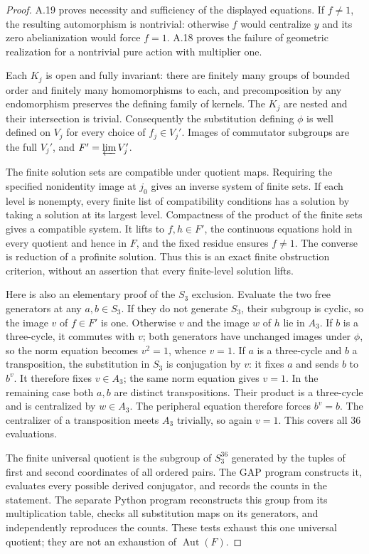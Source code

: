 \begin{proof}
A.19 proves necessity and sufficiency of the displayed
equations. If $f\ne1$, the resulting automorphism is
nontrivial: otherwise $f$ would centralize $y$ and its
zero abelianization would force $f=1$. A.18 proves the
failure of geometric realization for a nontrivial pure
action with multiplier one.

Each $K_j$ is open and fully invariant: there are finitely
many groups of bounded order and finitely many homomorphisms
to each, and precomposition by any endomorphism preserves
the defining family of kernels. The $K_j$ are nested and
their intersection is trivial. Consequently the
substitution defining $\phi$ is well defined on $V_j$
for every choice of $f_j\in V_j'$. Images of commutator
subgroups are the full $V_j'$, and
$F'=\varprojlim V_j'$.

The finite solution sets are compatible under quotient
maps. Requiring the specified nonidentity image at
$j_0$ gives an inverse system of finite sets. If each
level is nonempty, every finite list of compatibility
conditions has a solution by taking a solution at its
largest level. Compactness of the product of the finite
sets gives a compatible system. It lifts to $f,h\in F'$,
the continuous equations hold in every quotient and
hence in $F$, and the fixed residue ensures $f\ne1$.
The converse is reduction of a profinite solution. Thus
this is an exact finite obstruction criterion, without
an assertion that every finite-level solution lifts.

Here is also an elementary proof of the $S_3$ exclusion.
Evaluate the two free generators at any $a,b\in S_3$.
If they do not generate $S_3$, their subgroup is cyclic,
so the image $v$ of $f\in F'$ is one. Otherwise
$v$ and the image $w$ of $h$ lie in $A_3$.
If $b$ is a three-cycle, it commutes with $v$; both
generators have unchanged images under $\phi$, so the
norm equation becomes $v^2=1$, whence $v=1$.
If $a$ is a three-cycle and $b$ a transposition, the
substitution in $S_3$ is conjugation by $v$: it fixes
$a$ and sends $b$ to $b^v$. It therefore fixes
$v\in A_3$; the same norm equation gives $v=1$.
In the remaining case both $a,b$ are distinct
transpositions. Their product is a three-cycle and is
centralized by $w\in A_3$. The peripheral equation
therefore forces $b^v=b$. The centralizer of a
transposition meets $A_3$ trivially, so again $v=1$.
This covers all $36$ evaluations.

The finite universal quotient is the subgroup of
$S_3^{36}$ generated by the tuples of first and second
coordinates of all ordered pairs. The GAP program
constructs it, evaluates every possible derived
conjugator, and records the counts in the statement.
The separate Python program reconstructs this group
from its multiplication table, checks all substitution
maps on its generators, and independently reproduces
the counts. These tests exhaust this one universal
quotient; they are not an exhaustion of
$\operatorname{Aut}(F)$.
\end{proof}

